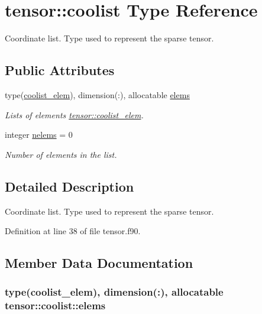 \hypertarget{structtensor_1_1coolist}{}\section{tensor\+:\+:coolist Type Reference}
\label{structtensor_1_1coolist}


Coordinate list. Type used to represent the sparse tensor.  


\subsection*{Public Attributes}
\begin{DoxyCompactItemize}
\item 
type(\hyperlink{structtensor_1_1coolist__elem}{coolist\+\_\+elem}), dimension(\+:), allocatable \hyperlink{structtensor_1_1coolist_a49ece7bfa6e6e37b4223a1c63b5c7839}{elems}
\begin{DoxyCompactList}\small\item\em Lists of elements \hyperlink{structtensor_1_1coolist__elem}{tensor\+::coolist\+\_\+elem}. \end{DoxyCompactList}\item 
integer \hyperlink{structtensor_1_1coolist_aac72e7727f1b161da2b9d54e25eb7aae}{nelems} = 0
\begin{DoxyCompactList}\small\item\em Number of elements in the list. \end{DoxyCompactList}\end{DoxyCompactItemize}


\subsection{Detailed Description}
Coordinate list. Type used to represent the sparse tensor. 

Definition at line 38 of file tensor.\+f90.



\subsection{Member Data Documentation}
\subsubsection[{\texorpdfstring{elems}{elems}}]{\setlength{\rightskip}{0pt plus 5cm}type({\bf coolist\+\_\+elem}), dimension(\+:), allocatable tensor\+::coolist\+::elems}\hypertarget{structtensor_1_1coolist_a49ece7bfa6e6e37b4223a1c63b5c7839}{}\label{structtensor_1_1coolist_a49ece7bfa6e6e37b4223a1c63b5c7839}


